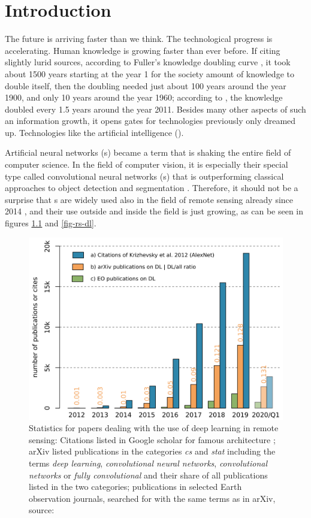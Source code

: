 \chapter{Introduction}
\label{intro}

The future is arriving faster than we think. The technological progress is accelerating. Human knowledge is growing faster than ever before. If citing slightly lurid sources, according to Fuller's knowledge doubling curve \cite{knowledge-doubling-curve}, it took about 1500 years starting at the year 1 for the society amount of knowledge to double itself, then the doubling needed just about 100 years around the year 1900, and only 10 years around the year 1960; according to \cite{growth-forecast}, the knowledge doubled every 1.5 years around the year 2011. Besides many other aspects of such an information growth, it opens gates for technologies previously only dreamed up. Technologies like the artificial intelligence ().

Artificial neural networks (s) became a term that is shaking the entire field of computer science. In the field of computer vision, it is especially their special type called convolutional neural networks (s) that is outperforming classical approaches to object detection and segmentation \cite{cnn-off-the=shelf}. Therefore, it should not be a surprise that s are widely used also in the field of remote sensing already since 2014 \cite{review-dl-rs-2017}, and their use outside and inside the field is just growing, as can be seen in figures \ref{fig-dl} and \ref{fig-rs-dl}.

\begin{figure}[h]
   \centering
	\includegraphics[width=0.6\linewidth]{./pictures/dl-papers.png}
	\caption[Papers on the use of DL]{Statistics for papers dealing with the use of deep learning in remote sensing: Citations listed in Google scholar for famous  architecture \cite{cnn-classification}; arXiv listed publications in the categories \textit{cs} and \textit{stat} including the terms \textit{deep learning}, \textit{convolutional neural networks}, \textit{convolutional networks} or \textit{fully convolutional} and their share of all publications listed in the two categories; publications in selected Earth observation journals, searched for with the same terms as in arXiv, source: \cite{review-dl-eo}}
      \label{fig-dl}
\end{figure}

